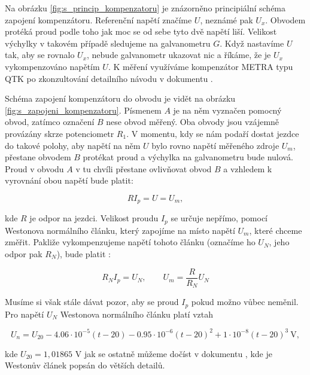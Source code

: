 \documentclass[english]{article}
\newcommand{\unit}[1]{\mathrm{#1}}
\begin{document}
Na obrázku \ref{fig:s_princip_kompenzatoru} je znázorněno principiální schéma zapojení kompenzátoru. Referenční napětí značíme $U$, neznámé pak $U_{x}$. Obvodem protéká proud podle toho jak moc se od sebe tyto dvě napětí liší. Velikost výchylky v takovém případě sledujeme na galvanometru $G$. Když nastavíme $U$ tak, aby se rovnalo $U_{x}$, nebude galvanometr ukazovat nic a říkáme, že je $U_{x}$ vykompenzováno napětím $U$. K měření využíváme kompenzátor METRA typu QTK po zkonzultování detailního návodu v dokumentu \cite{bib:pra_navody_o}.

Schéma zapojení kompenzátoru do obvodu je vidět na obrázku \ref{fig:s_zapojeni_kompenzatoru}. Písmenem $A$ je na něm vyznačen pomocný obvod, zatímco označení $B$ nese obvod měřený. Oba obvody jsou vzájemně provázány skrze potenciometr $R_{1}$. V momentu, kdy se nám podaří dostat jezdce do takové polohy, aby napětí na něm $U$ bylo rovno napětí měřeného zdroje $U_{m}$, přestane obvodem $B$ protékat proud a výchylka na galvanometru bude nulová. Proud v obvodu $A$ v tu chvíli přestane ovlivňovat obvod $B$ a vzhledem k vyrovnání obou napětí bude platit:

\begin{equation}
RI_{p} = U = U_{m},
\label{eq:e_kompenzator_1}
\end{equation}

kde $R$ je odpor na jezdci. Velikost proudu $I_p$ se určuje nepřímo, pomocí Westonova normálního článku, který zapojíme na místo napětí $U_{m}$, které chceme změřit. Pakliže vykompenzujeme napětí tohoto článku (označíme ho $U_{N}$, jeho odpor pak $R_N$), bude platit :

\begin{equation}
R_{N}I_{p} = U_{N}, \qquad U_{m} = \frac{R}{R_{N}}U_{N}
\label{eq:e_kompenzator_2}
\end{equation}

Musíme si však stále dávat pozor, aby se proud $I_{p}$ pokud možno vůbec neměnil. Pro napětí $U_{N}$ Westonova normálního článku platí vztah

\begin{equation}
U_n = U_{20} - 4.06 \cdot 10^{-5} (t-20) - 0.95 \cdot 10^{-6} (t-20)^2 + 1 \cdot 10 ^{-8} (t-20)^3 \ \unit{V},
\label{eq:e_weston_1}
\end{equation}

kde $U_{20} = 1,01865$ V jak se ostatně můžeme dočíst v dokumentu \cite{bib:pra_navody_o}, kde je Westonův článek popsán do větších detailů.
\end{document}
